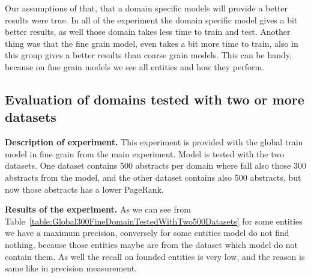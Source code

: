 \documentclass[thesis=M,english]{FITthesis}[2018/05/30]
\begin{document}
	Our assumptions of that, that a domain specific models will provide a better results were true. In all of the experiment the domain specific model gives a bit better results, as well those domain takes less time to train and test. Another thing was that the fine grain model, even takes a bit more time to train, also in this group gives a better results than coarse grain models. This can be handy, because on fine grain models we see all entities and how they perform.
\subsection{Evaluation of domains tested with two or more datasets}\label{MixedExperiments}

\textbf{Description of experiment.} This experiment is provided with the global train model in fine grain from the main experiment. Model is tested with the two datasets. One dataset contains 500 abstracts per domain where fall also those 300 abstracts from the model, and the other dataset contains also 500 abstracts, but now those abstracts has a lower PageRank. 

\textbf{Results of the experiment.} As we can see from Table~\ref{table:Global300FineDomainTestedWithTwo500Datasets} for some entities we have a maximum precision, conversely for some entities model do not find nothing, because those entities maybe are from the dataset which model do not contain them. As well the recall on founded entities is very low, and the reason is same like in precision measurement.
\end{document}
